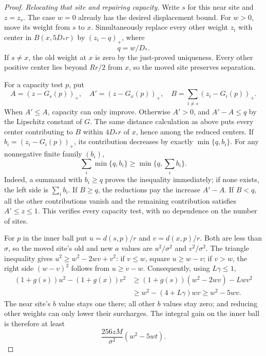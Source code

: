\begin{proof}
\emph{Relocating that site and repairing capacity.}
Write $s$ for this near site and $z=z_s$.  The case $w=0$ already has
the desired displacement bound.  For $w>0$, move its weight from $s$ to
$x$.  Simultaneously replace every other weight $z_i$ with center in
$B(x,5D_*r)$ by $(z_i-q)_+$, where
\[
 q=w/D_*.
\]
If $s\ne x$, the old weight at $x$ is zero by the just-proved uniqueness.
Every other positive center lies beyond $Rr/2$ from $x$, so the moved
site preserves separation.

For a capacity test $p$, put
\[
 A=(z-G_s(p))_+,\quad A'=(z-G_x(p))_+,
 \quad B=\sum_{i\ne s}(z_i-G_i(p))_+.
\]
When $A'\le A$, capacity can only improve.  Otherwise $A'>0$, and
$A'-A\le q$ by the Lipschitz constant of $G$.  The same distance
calculation as above puts every center contributing to $B$ within
$4D_*r$ of $x$, hence among the reduced centers.  If
$b_i=(z_i-G_i(p))_+$, its contribution decreases by exactly
$\min\{q,b_i\}$.  For any nonnegative finite family $(b_i)$,
\begin{equation}
 \sum_i\min\{q,b_i\}\ge\min\{q,\sum_i b_i\}.
 \label{eq:pilot-capacity-repair}
\end{equation}
Indeed, a summand with $b_i\ge q$ proves the inequality immediately;
if none exists, the left side is $\sum_i b_i$.  If $B\ge q$, the
reductions pay the increase $A'-A$.  If $B<q$, all the other
contributions vanish and the remaining contribution satisfies $A'\le z\le1$.
This verifies every capacity test, with no dependence on the number of
sites.

For $p$ in the inner ball put $u=d(s,p)/r$ and $v=d(x,p)/r$.
Both are less than $\sigma$, so the moved site's old and new $a$
values are $u^2/\sigma^2$ and $v^2/\sigma^2$.  The triangle inequality
gives $u^2\ge w^2-2wv+v^2$: if $v\le w$, square $u\ge w-v$;
if $v>w$, the right side $(w-v)^2$ follows from $u\ge v-w$.
Consequently, using $L\gamma\le1$,
\begin{align*}
 (1+g(s))u^2-(1+g(x))v^2
 &\ge (1+g(s))(w^2-2wv)-Lwv^2\\
 &\ge w^2-(4+L\gamma)wv
 \ge w^2-5wv.
\end{align*}
The near site's $b$ value stays one there; all other $b$ values stay
zero; and reducing other weights can only lower their surcharges.
The integral gain on the inner ball is therefore at least
\begin{equation}
 \frac{256zM}{\sigma^2}(w^2-5wt).
 \label{eq:pilot-relocation-gain}
\end{equation}


\end{proof}
